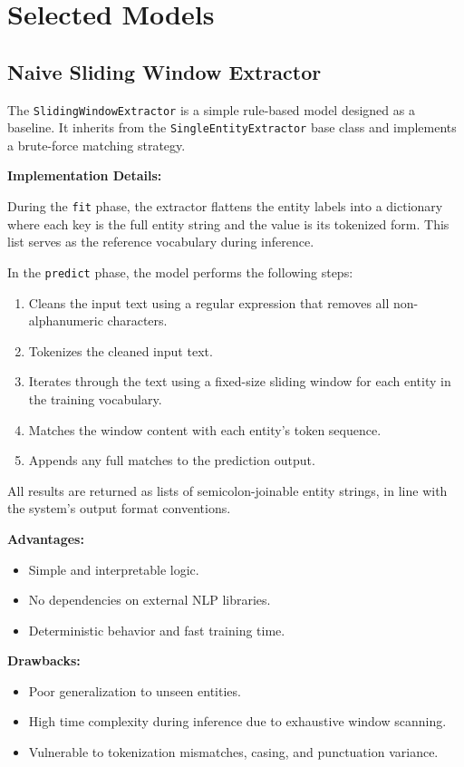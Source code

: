 \section{Selected Models}

\subsection{Naive Sliding Window Extractor}

The \texttt{SlidingWindowExtractor} is a simple rule-based model designed as a baseline. It inherits from the \texttt{SingleEntityExtractor} base class and implements a brute-force matching strategy.

\textbf{Implementation Details:}

During the \texttt{fit} phase, the extractor flattens the entity labels into a dictionary where each key is the full entity string and the value is its tokenized form. This list serves as the reference vocabulary during inference.

In the \texttt{predict} phase, the model performs the following steps:

\begin{enumerate}
  \item Cleans the input text using a regular expression that removes all non-alphanumeric characters.
  \item Tokenizes the cleaned input text.
  \item Iterates through the text using a fixed-size sliding window for each entity in the training vocabulary.
  \item Matches the window content with each entity’s token sequence.
  \item Appends any full matches to the prediction output.
\end{enumerate}

All results are returned as lists of semicolon-joinable entity strings, in line with the system’s output format conventions.

\textbf{Advantages:}
\begin{itemize}
  \item Simple and interpretable logic.
  \item No dependencies on external NLP libraries.
  \item Deterministic behavior and fast training time.
\end{itemize}

\textbf{Drawbacks:}
\begin{itemize}
  \item Poor generalization to unseen entities.
  \item High time complexity during inference due to exhaustive window scanning.
  \item Vulnerable to tokenization mismatches, casing, and punctuation variance.
\end{itemize}

